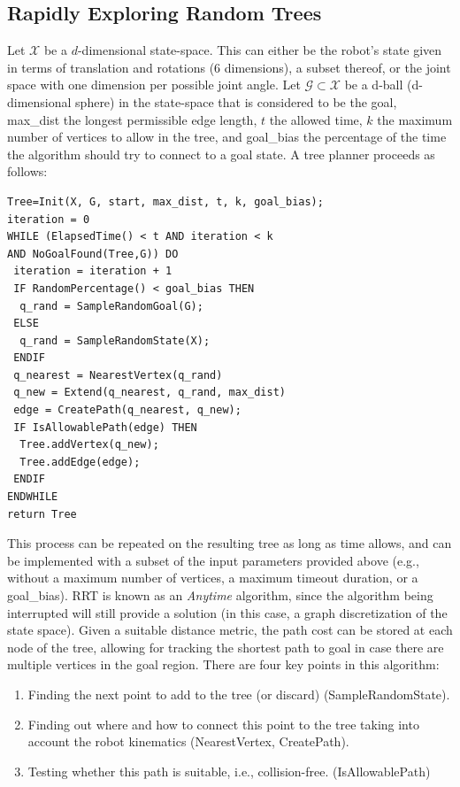 \subsection{Rapidly Exploring Random Trees}
Let $ \mathcal{X}$ be a $ d$-dimensional state-space. This can either be the robot's state given in terms of translation and rotations (6 dimensions), a subset thereof, or the joint space with one dimension per possible joint angle. Let $ \mathcal{G} \subset \mathcal{X}$ be a  d-ball (d-dimensional sphere) in the state-space that is considered to be the goal, max\_dist the longest permissible edge length, $t$ the allowed time, $k$ the maximum number of vertices to allow in the tree, and goal\_bias the percentage of the time the algorithm should try to connect to a goal state. A tree planner proceeds as follows:


\begin{verbatim}
Tree=Init(X, G, start, max_dist, t, k, goal_bias);
iteration = 0
WHILE (ElapsedTime() < t AND iteration < k 
AND NoGoalFound(Tree,G)) DO
 iteration = iteration + 1
 IF RandomPercentage() < goal_bias THEN
  q_rand = SampleRandomGoal(G);
 ELSE
  q_rand = SampleRandomState(X);
 ENDIF
 q_nearest = NearestVertex(q_rand)
 q_new = Extend(q_nearest, q_rand, max_dist)
 edge = CreatePath(q_nearest, q_new);
 IF IsAllowablePath(edge) THEN
  Tree.addVertex(q_new);
  Tree.addEdge(edge);
 ENDIF
ENDWHILE
return Tree
\end{verbatim}

This process can be repeated on the resulting tree as long as time allows, and can be implemented with a subset of the input parameters provided above (e.g., without a maximum number of vertices, a maximum timeout duration, or a goal\_bias). RRT is known as an  \textsl{Anytime} algorithm, since the algorithm being interrupted will still provide a solution (in this case, a graph discretization of the state space). Given a suitable distance metric, the path cost can be stored at each node of the tree, allowing for tracking the shortest path to goal in case there are multiple vertices in the goal region.
There are four key points in this algorithm:

\begin{enumerate}
    \item Finding the next point to add to the tree (or discard) (SampleRandomState).
    \item Finding out where and how to connect this point to the tree taking into account the robot kinematics (NearestVertex, CreatePath).
    \item Testing whether this path is suitable, i.e., collision-free. (IsAllowablePath)
\end{enumerate}

